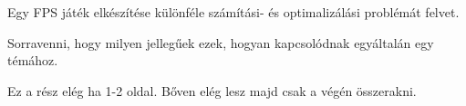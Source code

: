\label{Chap:bevezetes}

Egy FPS játék elkészítése különféle számítási- és optimalizálási problémát felvet.

Sorravenni, hogy milyen jellegűek ezek, hogyan kapcsolódnak egyáltalán egy témához.

Ez a rész elég ha 1-2 oldal. Bőven elég lesz majd csak a végén összerakni.
